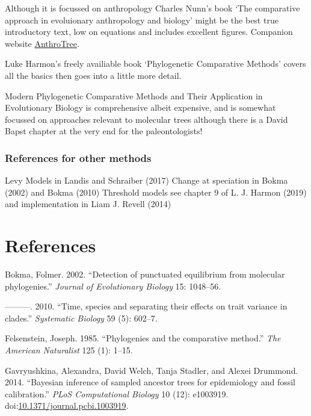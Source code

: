 \documentclass[]{article}
\begin{document}
Although it is focussed on anthropology Charles Nunn's book `The
comparative approach in evoluionary anthropology and biology' might be
the best true introductory text, low on equations and includes excellent
figures. Companion website
\href{https://wiki.duke.edu/display/AnthroTree/The+AnthroTree+Website}{AnthroTree}.

Luke Harmon's freely availiable book `Phylogenetic Comparative Methods'
covers all the basics then goes into a little more detail.

Modern Phylogenetic Comparative Methods and Their Application in
Evolutionary Biology is comprehensive albeit expensive, and is somewhat
focussed on approaches relevant to molecular trees although there is a
David Bapst chapter at the very end for the paleontologists!

\subsubsection{References for other
methods}\label{references-for-other-methods}

Levy Models in Landis and Schraiber (2017) Change at speciation in Bokma
(2002) and Bokma (2010) Threshold models see chapter 9 of L. J. Harmon
(2019) and implementation in Liam J. Revell (2014)

\section*{References}\label{references}

\hypertarget{refs}{}
\hypertarget{ref-Bokma2002}{}
Bokma, Folmer. 2002. ``Detection of punctuated equilibrium from
molecular phylogenies.'' \emph{Journal of Evolutionary Biology} 15:
1048--56.

\hypertarget{ref-Bokma2010}{}
---------. 2010. ``Time, species and separating their effects on trait
variance in clades.'' \emph{Systematic Biology} 59 (5): 602--7.

\hypertarget{ref-Felsenstein1985}{}
Felsenstein, Joseph. 1985. ``Phylogenies and the comparative method.''
\emph{The American Naturalist} 125 (1): 1--15.

\hypertarget{ref-Gavry2014}{}
Gavryushkina, Alexandra, David Welch, Tanja Stadler, and Alexei
Drummond. 2014. ``Bayesian inference of sampled ancestor trees for
epidemiology and fossil calibration.'' \emph{PLoS Computational Biology}
10 (12): e1003919.
doi:\href{https://doi.org/10.1371/journal.pcbi.1003919}{10.1371/journal.pcbi.1003919}.
\end{document}
